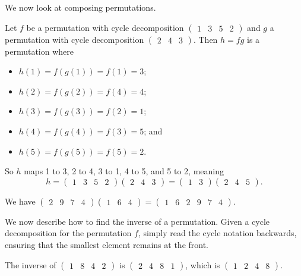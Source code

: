 We now look at composing permutations.
\begin{example}
    Let $f$ be a permutation with cycle decomposition $\begin{pmatrix}1 & 3 & 5 & 2\end{pmatrix}$ and $g$ a permutation with cycle decomposition $\begin{pmatrix}2 & 4 & 3\end{pmatrix}$. Then $h = fg$ is a permutation where
    \begin{itemize}
        \item $h(1) = f(g(1)) = f(1) = 3$;
        \item $h(2) = f(g(2)) = f(4) = 4$;
        \item $h(3) = f(g(3)) = f(2) = 1$;
        \item $h(4) = f(g(4)) = f(3) = 5$; and
        \item $h(5) = f(g(5)) = f(5) = 2$.
    \end{itemize}

    So $h$ maps 1 to 3, 2 to 4, 3 to 1, 4 to 5, and 5 to 2, meaning
    \[
        h = \begin{pmatrix}1 & 3 & 5 & 2\end{pmatrix}\begin{pmatrix}2 & 4 & 3\end{pmatrix} = \begin{pmatrix}1 & 3\end{pmatrix}\begin{pmatrix}2 & 4 & 5\end{pmatrix}.
    \]
\end{example}

\begin{example}
    We have $ \begin{pmatrix}2 & 9 & 7 & 4\end{pmatrix}\begin{pmatrix}1 & 6 & 4\end{pmatrix} = \begin{pmatrix}1 & 6 & 2 & 9 & 7 & 4\end{pmatrix}$.
\end{example}

We now describe how to find the inverse of a permutation. Given a cycle decomposition for the permutation $f$, simply read the cycle notation backwards, ensuring that the smallest element remains at the front.

\begin{example}
    The inverse of $\begin{pmatrix}1 & 8 & 4 & 2\end{pmatrix}$ is $\begin{pmatrix}2 & 4 & 8 & 1\end{pmatrix}$, which is $\begin{pmatrix}1 & 2 & 4 & 8\end{pmatrix}$.
\end{example}

